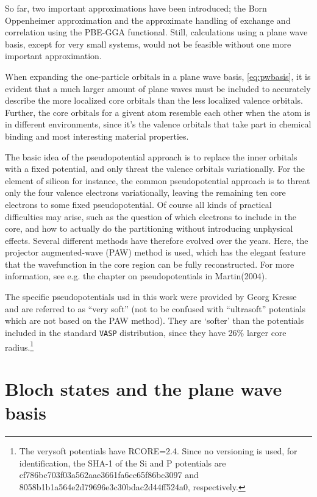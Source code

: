 \documentclass[11pt,bibliography=totoc,index=totoc]{scrbook}   %
\newcommand{\vasp}{{\texttt{VASP}}} %
\begin{document}
So far, two important approximations have been introduced; the Born Oppenheimer approximation 
and the approximate handling of exchange and correlation using the PBE-GGA functional. 
Still, calculations using a plane wave basis, except for very small systems, would not be feasible without one more important approximation.

When expanding the one-particle orbitals in a plane wave basis, \eqref{eq:pwbasis}, 
it is evident that a much larger amount of plane waves must be included to accurately describe the more localized core orbitals than the less localized valence orbitals. 
Further, the core orbitals for a givent atom resemble each other when the atom is in different environments, since it's the valence orbitals that take part in chemical binding and most interesting material properties.

The basic idea of the pseudopotential approach is to replace the inner orbitals with a fixed potential, and only threat the valence orbitals variationally.
For the element of silicon for instance, the common pseudopotential approach is to threat only the four valence electrons variationally,
leaving the remaining ten core electrons to some fixed pseudopotential.
Of course all kinds of practical difficulties may arise, such as the question of which electrons to include in the core, and how to actually do the partitioning without introducing unphysical effects.
Several different methods have therefore evolved over the years.
Here, the projector augmented-wave (PAW) method\cite{Blochl:1994} is used, which has the elegant feature that the wavefunction in the core region can be fully reconstructed.
For more information, see e.g. the chapter on pseudopotentials in Martin(2004)\cite[204-299]{Martin:2004}.

The specific pseudopotentials usd in this work were provided by Georg Kresse and are referred to as ``very soft''\cite{verysoftpot} (not to be confused with ``ultrasoft'' potentials which are not based on the PAW method).
They are `softer' than the potentials included in the standard {\vasp} distribution,\cite{Kresse:1999}
since they have 26\% larger core radius.\footnote{The verysoft potentials have RCORE=2.4. Since no versioning is used, for identification, the SHA-1 of the Si and P potentials are cf786bc703f03a562aae3661fa6cc65f86bc3097 and 8058b1b1a564e2d79696e3c30bdac2d44ff524a0, respectively.}

%
\section{Bloch states and the plane wave basis}\label{sec:planewavebasis}
%
\end{document}
